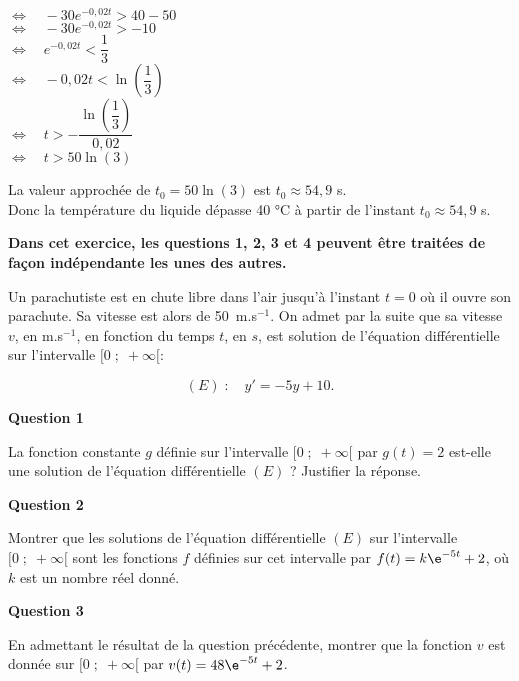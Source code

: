 \documentclass[a4paper,11pt,exos]{nsi}
\begin{document}
{\begin{enumerate}
\begin{tabbing}
            \> $\iff\quad -30e^{-0{,}02t} > 40 - 50$\\
            \> $\iff\quad -30e^{-0{,}02t} > -10$\\
            \> $\iff\quad e^{-0{,}02t} < \dfrac{1}{3}$\\
            \> $\iff\quad -0{,}02t < \ln\left(\dfrac{1}{3}\right)$\\
            \> $\iff\quad t > -\dfrac{\ln\left(\dfrac{1}{3}\right)}{0{,}02}$\\
            \> $\iff\quad t > 50\ln(3)$    
        \end{tabbing}
        La valeur approchée de $t_0=50\ln(3)$ est $t_0 \approx 54{,}9$ s.\\
        Donc la température du liquide dépasse 40 °C à partir de l'instant $t_0 \approx 54{,}9$ s.
    \end{enumerate}
}

\textbf{Dans cet exercice, les questions 1, 2, 3 et 4 peuvent être traitées de façon indépendante les unes des autres.}

Un parachutiste est en chute libre dans l'air jusqu'à l'instant $t = 0$ où il ouvre son parachute. Sa vitesse est alors de 50~m.s$^{-1}$. On admet par la suite que sa vitesse $v$, en m.s$^{-1}$, en fonction du temps $t$, en $s$, est solution de l'équation différentielle sur l'intervalle $[0\;;\;+\infty[$:

\[(E)\;:\quad y'=-5y+10.\]


\begin{flushleft}
\textbf{Question 1}
\end{flushleft}

La fonction constante $g$ définie sur l'intervalle $[0\;;\;+\infty[$ par $g(t)=2$ est-elle une solution de l'équation différentielle $(E)$ ? 
Justifier la réponse.

\begin{flushleft}
\textbf{Question 2}
\end{flushleft}

Montrer que les solutions de l'équation différentielle $(E)$ sur l'intervalle $[0\;;\;+\infty[$ sont les fonctions $f$ définies sur cet intervalle par $f(t)=k\e^{-5t}+2$, où $k$ est un nombre réel donné.

\begin{flushleft}
\textbf{Question 3}
\end{flushleft}

En admettant le résultat de la question précédente, montrer que la fonction $v$ est donnée sur $[0\;;\;+\infty[$ par $v(t) = 48 \e^{-5t} + 2$.
\end{document}
